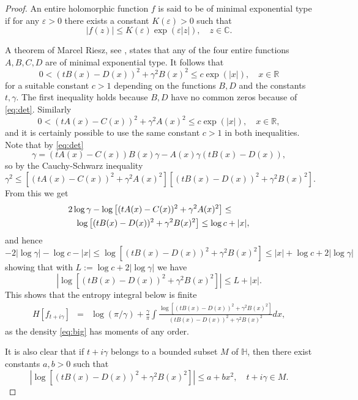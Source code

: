 \documentclass [12pt]{article}
\newcommand{\C}{\mathbb{C}}
\newcommand{\R}{\mathbb{R}}
\renewcommand{\H}{\mathbb{H}}
\begin{document}
\begin{proof} An entire holomorphic function $f$ is said to be of minimal exponential type if for any $\varepsilon>0$ there exists a constant $K(\varepsilon)>0$ such that
\begin{equation}
|f(z)|\le K(\varepsilon)\exp(\varepsilon |z|),\quad z\in \C.
\end{equation}

A  theorem of Marcel Riesz, see \cite[Theorem 2.4.3]{Ak}, states that any of the four entire functions $A,B,C,D$ are of minimal exponential type. It follows that
$$
0<(tB(x)-D(x))^2+\gamma^2B(x)^2\le  c\exp(|x|), \quad x\in \R
$$
for a suitable constant $c>1$ depending on the functions $B,D$ and the constants $t,\gamma$. The first inequality holds because $B,D$ have no common zeros because of \eqref{eq:det}.
Similarly
$$
0<(tA(x)-C(x))^2+\gamma^2 A(x)^2\le  c\exp(|x|), \quad x\in \R,
$$
and it is certainly possible to use the same constant $c>1$ in both inequalities.
Note that by \eqref{eq:det}
$$
\gamma=(tA(x)-C(x))B(x)\gamma - A(x)\gamma(tB(x)-D(x)),
$$ 
so by the Cauchy-Schwarz inequality
$$
\gamma^2\le \left[(tA(x)-C(x))^2+\gamma^2A(x)^2\right]\left[(tB(x)-D(x))^2+\gamma^2B(x)^2\right].
$$ 
From this we get
\begin{eqnarray*}
\lefteqn{2\log\gamma - \log\left[(tA(x)-C(x))^2+\gamma^2A(x)^2\right]\le}\\ && \log\left[(tB(x)-D(x))^2+\gamma^2B(x)^2\right]\le \log c +|x|, 
\end{eqnarray*}
and hence
$$
-2|\log\gamma|-\log c-|x|\le
\log\left[(tB(x)-D(x))^2+\gamma^2B(x)^2\right]\le |x|+ \log c + 2|\log\gamma|
$$
showing that with $L:=\log c + 2 |\log\gamma|$ we have
\begin{equation}\label{eq:maj}
\left|\log\left[(tB(x)-D(x))^2+\gamma^2B(x)^2\right]\right|\le L+|x|.
\end{equation}
This shows that the entropy integral below is finite
\begin{eqnarray}\label{eq:entropy}
H[f_{t+i\gamma}]&=&\log(\pi/\gamma)+\frac{\gamma}{\pi}\int\frac{\log[(tB(x)-D(x))^2+\gamma^2B(x)^2]}{(tB(x)-D(x))^2+\gamma^2B(x)^2}dx,
\end{eqnarray}
as the density \eqref{eq:big} has moments of any order. 

It is also clear that  if $t+i\gamma$ belongs to a bounded subset $M$  of $\H$, then there exist constants $a,b>0$ such that
\begin{equation}\label{eq:maj2}
\left|\log\left[(tB(x)-D(x))^2+\gamma^2B(x)^2\right]\right|\le a+bx^2,\quad t+i\gamma\in M.
\end{equation} 


\end{proof}
\end{document}
